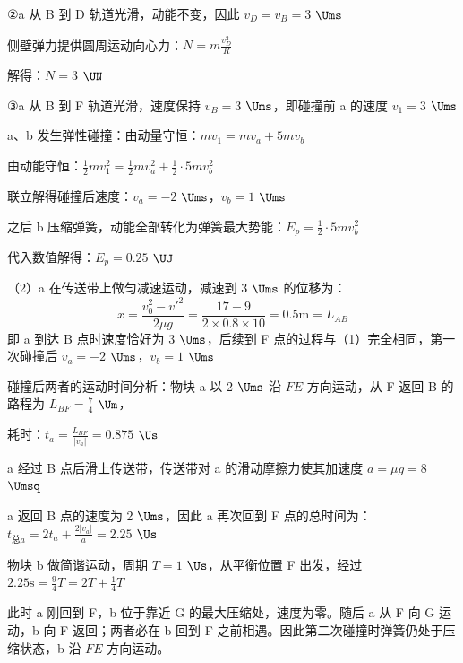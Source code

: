 \documentclass[\gkver]{gaokaozhenti}
\begin{document}
\begin{enumerate}
{②a 从 B 到 D 轨道光滑，动能不变，因此 $v_{D}=v_{B}=3$ $\Ums$

侧壁弹力提供圆周运动向心力：$N=m\frac{v_{D}^{2}}{R}$

解得：$N=3$ $\UN$

③a 从 B 到 F 轨道光滑，速度保持 $v_{B}=3$ $\Ums$，即碰撞前 a 的速度 $v_{1}=3$ $\Ums$

a、b 发生弹性碰撞：由动量守恒：$mv_{1}=mv_{a}+5mv_{b}$

由动能守恒：$\frac{1}{2}mv_{1}^{2}=\frac{1}{2}mv_{a}^{2}+\frac{1}{2}\cdot5mv_{b}^{2}$

联立解得碰撞后速度：$v_{a}=-2$ $\Ums$，$v_{b}=1$ $\Ums$

之后 b 压缩弹簧，动能全部转化为弹簧最大势能：$E_{p}=\frac{1}{2}\cdot5mv_{b}^{2}$

代入数值解得：$E_{p}=0.25$ $\UJ$

（2）a 在传送带上做匀减速运动，减速到 3 $\Ums$ 的位移为：
\[ x=\frac{v_{0}^{2}-v'^{2}}{2\mu g}=\frac{17-9}{2\times0.8\times10}=0.5\mathrm{m}=L_{AB} \]
即 a 到达 B 点时速度恰好为 3 $\Ums$，后续到 F 点的过程与（1）完全相同，第一次碰撞后 $v_{a}=-2$ $\Ums$，$v_{b}=1$ $\Ums$

碰撞后两者的运动时间分析：物块 a 以 2 $\Ums$ 沿 $FE$ 方向运动，从 F 返回 B 的路程为 $L_{BF}=\frac{7}{4}$ $\Um$，

耗时：$t_{a}=\frac{L_{BF}}{|v_{a}|}=0.875$ $\Us$

a 经过 B 点后滑上传送带，传送带对 a 的滑动摩擦力使其加速度 $a=\mu g=8$ $\Umsq$

a 返回 B 点的速度为 2 $\Ums$，因此 a 再次回到 F 点的总时间为：$t_{\text{总}a}=2t_{a}+\frac{2|v_{a}|}{a}=2.25$ $\Us$

物块 b 做简谐运动，周期 $T=1$ $\Us$，从平衡位置 F 出发，经过 $2.25\mathrm{s}=\frac{9}{4}T=2T+\frac{1}{4}T$

此时 a 刚回到 F，b 位于靠近 G 的最大压缩处，速度为零。随后 a 从 F 向 G 运动，b 向 F 返回；两者必在 b 回到 F 之前相遇。因此第二次碰撞时弹簧仍处于压缩状态，b 沿 $FE$ 方向运动。
}


\end{enumerate}
\end{document}
